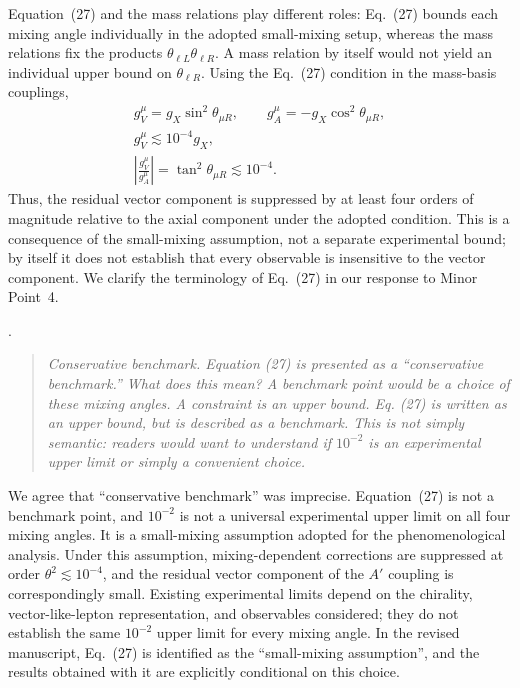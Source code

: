 \documentclass[12pt,a4paper]{article}
\begin{document}
Equation~(27) and the mass relations play different roles: Eq.~(27) bounds each mixing angle individually in the adopted small-mixing setup, whereas the mass relations fix the products \(\theta_{\ell L}\theta_{\ell R}\). A mass relation by itself would not yield an individual upper bound on \(\theta_{\ell R}\). Using the Eq.~(27) condition in the mass-basis couplings,
\[
\begin{gathered}
g_V^\mu=g_X\sin^2\theta_{\mu R},\qquad
g_A^\mu=-g_X\cos^2\theta_{\mu R},\\
g_V^\mu\lesssim10^{-4}g_X,\\
\left|\frac{g_V^\mu}{g_A^\mu}\right|=\tan^2\theta_{\mu R}\lesssim10^{-4}.
\end{gathered}
\]
Thus, the residual vector component is suppressed by at least four orders of magnitude relative to the axial component under the adopted condition. This is a consequence of the small-mixing assumption, not a separate experimental bound; by itself it does not establish that every observable is insensitive to the vector component. We clarify the terminology of Eq.~(27) in our response to Minor Point~4.

\medskip
{}.
\begin{quote}\itshape
Conservative benchmark. Equation (27) is presented as a ``conservative benchmark.'' What does this mean? A benchmark point would be a choice of these mixing angles. A constraint is an upper bound. Eq. (27) is written as an upper bound, but is described as a benchmark. This is not simply semantic: readers would want to understand if \(10^{-2}\) is an experimental upper limit or simply a convenient choice.
\end{quote}

We agree that ``conservative benchmark'' was imprecise. Equation~(27) is not a benchmark point, and \(10^{-2}\) is not a universal experimental upper limit on all four mixing angles. It is a small-mixing assumption adopted for the phenomenological analysis. Under this assumption, mixing-dependent corrections are suppressed at order \(\theta^2\lesssim10^{-4}\), and the residual vector component of the \(A'\) coupling is correspondingly small. Existing experimental limits depend on the chirality, vector-like-lepton representation, and observables considered; they do not establish the same \(10^{-2}\) upper limit for every mixing angle. In the revised manuscript, Eq.~(27) is identified as the ``small-mixing assumption'', and the results obtained with it are explicitly conditional on this choice.
\end{document}
